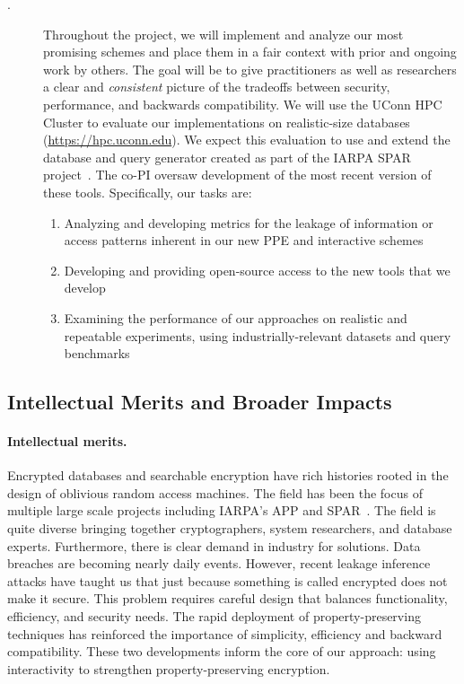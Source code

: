 \begin{description}
\item[.] Throughout the project, we will implement
and analyze our most promising schemes and place them in a fair context
with prior and ongoing work by others. The goal will be to give
practitioners as well as researchers a clear and \emph{consistent}
picture of the tradeoffs between security, performance, and backwards
compatibility.
We will use the UConn HPC Cluster to evaluate our
implementations on realistic-size databases (\url{https://hpc.uconn.edu}).
We expect this evaluation
to use and extend the database and query generator created as part of
the IARPA SPAR project~\cite{varia2015automated}. The co-PI oversaw development of the most recent version of these tools. Specifically, our
tasks are:
\begin{enumerate}
\setlength\itemsep{0em}
\item Analyzing and developing metrics for the leakage of
information or access patterns inherent in our new PPE and interactive
schemes
\item Developing and providing open-source access to the new tools that
we develop
\item Examining the performance of our approaches on realistic and
repeatable experiments, using industrially-relevant datasets and query
benchmarks
\end{enumerate}
\end{description}

\subsection{Intellectual Merits and Broader Impacts}
\paragraph{Intellectual merits.}  
Encrypted databases and searchable encryption have rich histories rooted in the
design of oblivious random access machines.  The field has been the focus of multiple large scale projects including IARPA's APP and SPAR~\cite{spar_baa}.  The field is quite diverse bringing together cryptographers, system researchers, and database experts.  Furthermore, there is clear demand in industry for solutions.  Data breaches are becoming nearly daily events.  However, recent
leakage inference attacks have taught us that just because something is called encrypted does not make it secure.  This problem requires careful design that balances functionality, efficiency, and security needs.  The rapid deployment of property-preserving
techniques has reinforced the importance of simplicity, efficiency and backward
compatibility.  These two developments inform the core of our approach: using
interactivity to strengthen property-preserving encryption.

